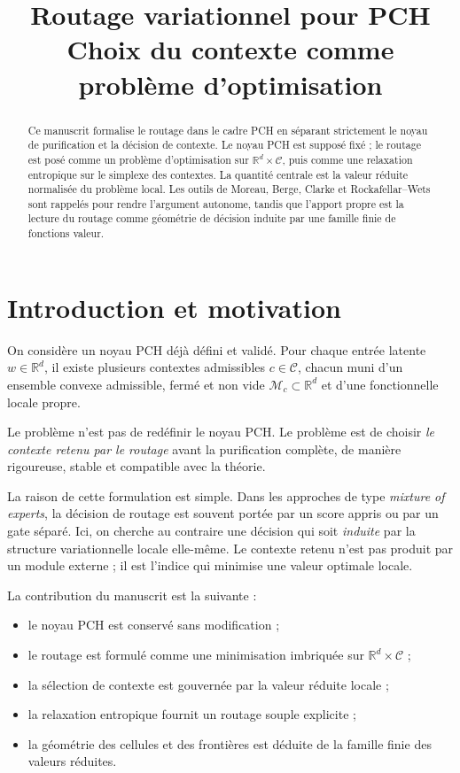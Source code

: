 \documentclass[11pt,a4paper]{article}
\title{Routage variationnel pour PCH\\
\large Choix du contexte comme problème d'optimisation}
\author{}
\date{}
\newcommand{\R}{\mathbb R}
\newcommand{\Mcal}{\mathcal M}
\newcommand{\Ccal}{\mathcal C}
\begin{document}
\maketitle

\begin{abstract}
Ce manuscrit formalise le routage dans le cadre PCH en séparant strictement le noyau de purification et la décision de contexte. Le noyau PCH est supposé fixé ; le routage est posé comme un problème d'optimisation sur \(\R^d\times\Ccal\), puis comme une relaxation entropique sur le simplexe des contextes. La quantité centrale est la valeur réduite normalisée du problème local. Les outils de Moreau, Berge, Clarke et Rockafellar--Wets sont rappelés pour rendre l'argument autonome, tandis que l'apport propre est la lecture du routage comme géométrie de décision induite par une famille finie de fonctions valeur.
\end{abstract}

\tableofcontents

\section{Introduction et motivation}

On considère un noyau PCH déjà défini et validé. Pour chaque entrée latente \(w\in\R^d\), il existe plusieurs contextes admissibles \(c\in\Ccal\), chacun muni d'un ensemble convexe admissible, fermé et non vide \(\Mcal_c\subset\R^d\) et d'une fonctionnelle locale propre.

Le problème n'est pas de redéfinir le noyau PCH. Le problème est de choisir \emph{le contexte retenu par le routage} avant la purification complète, de manière rigoureuse, stable et compatible avec la théorie.

La raison de cette formulation est simple. Dans les approches de type \emph{mixture of experts}, la décision de routage est souvent portée par un score appris ou par un gate séparé. Ici, on cherche au contraire une décision qui soit \emph{induite} par la structure variationnelle locale elle-même. Le contexte retenu n'est pas produit par un module externe ; il est l'indice qui minimise une valeur optimale locale.

La contribution du manuscrit est la suivante :
\begin{itemize}[leftmargin=2em]
    \item le noyau PCH est conservé sans modification ;
    \item le routage est formulé comme une minimisation imbriquée sur \(\R^d\times\Ccal\) ;
    \item la sélection de contexte est gouvernée par la valeur réduite locale ;
    \item la relaxation entropique fournit un routage souple explicite ;
    \item la géométrie des cellules et des frontières est déduite de la famille finie des valeurs réduites.
\end{itemize}
\end{document}
